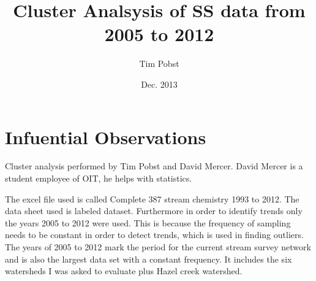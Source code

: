\documentclass[11pt]{article} %
\title{Cluster Analsysis of SS data from 2005 to 2012}
\author{Tim Pobst}
\date{Dec. 2013} %
\begin{document}
\maketitle

\section{Infuential Observations}

Cluster analysis performed by Tim Pobst and David Mercer.  David Mercer is a student employee of OIT, he helps with statistics.
    
The excel file used is called Complete 387 stream chemistry 1993 to 2012.  The data sheet used is labeled dataset.  Furthermore in order to identify trends only the years 2005 to 2012 were used.  This is because the frequency of sampling needs to be constant in order to detect trends, which is used in finding outliers.  The years of 2005 to 2012 mark the period for the current stream survey network and is also the largest data set with a constant frequency.  It includes the six watersheds I was asked to evaluate plus Hazel creek watershed.
\end{document}
